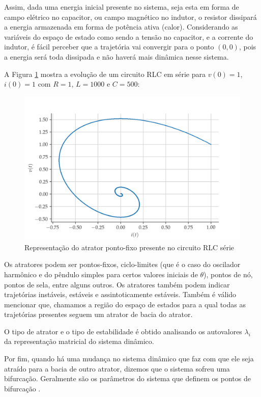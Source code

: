 \documentclass[a4paper, 12pt]{article}
\begin{document}
Assim, dada uma energia inicial presente no sistema, seja esta em forma de campo elétrico no capacitor, ou campo magnético no indutor, o resistor dissipará a energia armazenada em forma de potência ativa (calor). Considerando as variáveis do espaço de estado como sendo a tensão no capacitor, e a corrente do indutor, é fácil perceber que a trajetória vai convergir para o ponto $(0, 0)$, pois a energia será toda dissipada e não haverá mais dinâmica nesse sistema.

A Figura \ref{fig:rlc-phase-space} mostra a evolução de um circuito RLC em série para $v(0) = 1$, $i(0) = 1$ com $R = 1$, $L = 1000$ e $C = 500$:
\begin{figure}[!ht]
\centering
\includegraphics[scale = 0.7]{rlc-phase-space.png}
\caption{Representação do atrator ponto-fixo presente no circuito RLC série}
\label{fig:rlc-phase-space}
\end{figure}

Os atratores podem ser pontos-fixos, ciclo-limites (que é o caso do oscilador harmônico e do pêndulo simples para certos valores iniciais de $\theta$), pontos de nó, pontos de sela, entre alguns outros. Os atratores também podem indicar trajetórias instáveis, estáveis e assintoticamente estáveis. Também é válido mencionar que, chamamos a região do espaço de estados para a qual todas as trajetórias presentes seguem um atrator de bacia do atrator.

O tipo de atrator e o tipo de estabilidade é obtido analisando os autovalores $\lambda_i$ da representação matricial do sistema dinâmico.

Por fim, quando há uma mudança no sistema dinâmico que faz com que ele seja atraído para a bacia de outro atrator, dizemos que o sistema sofreu uma bifurcação. Geralmente são os parâmetros do sistema que definem os pontos de bifurcação \cite{fiedler1994caos}.
\end{document}
